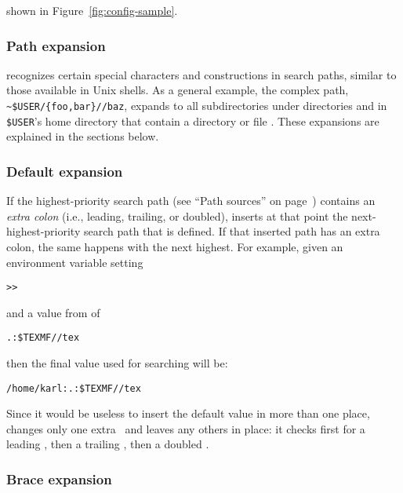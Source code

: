 \documentclass{article}
\begin{document}

\else
shown in Figure~\ref{fig:config-sample}.
\fi

\subsubsection{Path expansion}
\label{Path-expansion}


\KPS{} recognizes certain special characters and constructions in
search paths, similar to those available in Unix shells.  As a
general example, the  complex path,
\verb+~$USER/{foo,bar}//baz+, expands to all subdirectories under
directories  and  in \texttt{\$USER}'s home
directory that contain a directory or file .  These
expansions are explained in the sections below.
\subsubsection{Default expansion}
\label{Default-expansion}

If the highest-priority search path (see ``Path sources'' on
page~\pageref{Path-sources}) contains an \emph{extra colon} (i.e.,
leading, trailing, or doubled), \KPS{} inserts at that point the
next-highest-prio\-rity search path that is defined.  If that inserted
path has an extra colon, the same happens with the next highest.  For
example, given an environment variable setting


\begin{alltt}
>> 
\end{alltt}
and a  value from  of

\begin{alltt}
  .:\$TEXMF//tex
\end{alltt}
then the final value used for searching will be:

\begin{alltt}
  /home/karl:.:\$TEXMF//tex
\end{alltt}

Since it would be useless to insert the default value in more than one
place, \KPS{} changes only one extra \samp{:}\ and leaves any others in
place: it checks first for a leading \samp{:}, then a trailing
\samp{:}, then a doubled \samp{:}.

\subsubsection{Brace expansion}
\end{document}
